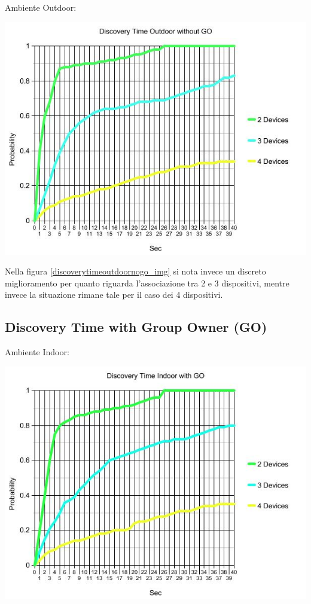 Ambiente Outdoor:
\begin{center}
\includegraphics[width=1\textwidth]{imgs/Discovery_Time_Outdoor_no_GO.jpg}
\label{discoverytimeoutdoornogo_img}%
\end{center}

Nella figura \ref{discoverytimeoutdoornogo_img} si nota invece un discreto miglioramento per quanto riguarda l'associazione tra 2 e 3 dispositivi, mentre invece la situazione rimane tale per il caso dei 4 dispositivi.
\newpage

\subsection{Discovery Time with Group Owner (GO)}

Ambiente Indoor:
\begin{center}
\includegraphics[width=1\textwidth]{imgs/Discovery_Time_Indoor_with_GO.jpg}
\label{discoverytimeindoorwithgo_img}%
\end{center}

